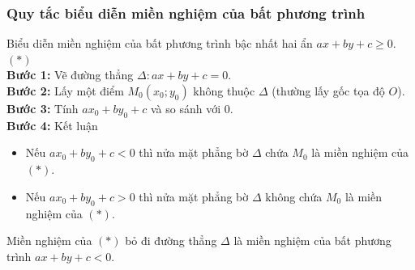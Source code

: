 \subsubsection{Quy tắc biểu diễn miền nghiệm của bất phương trình}
\begin{khung4}{}
	Biểu diễn miền nghiệm của bất phương trình bậc nhất hai ẩn $ax+by+c\geq 0$.\quad $(*)$\\
\textbf{Bước 1:} Vẽ đường thẳng $\Delta\colon ax+by+c=0$.\\
\textbf{Bước 2:} Lấy một điểm $M_0\left(x_0;y_0\right)$ không thuộc $\Delta$ (thường lấy gốc tọa độ $O$).\\
\textbf{Bước 3:} Tính $ax_0+by_0+c$ và so sánh với $0$.\\
\textbf{Bước 4:} Kết luận
	\begin{itemize}
		\item Nếu $ax_0+by_0+c<0$ thì nửa mặt phẳng bờ $\Delta$ chứa $M_0$ là miền nghiệm của $(*)$.
		\item Nếu $ax_0+by_0+c>0$ thì nửa mặt phẳng bờ $\Delta$ không chứa $M_0$ là miền nghiệm của $(*)$.
	\end{itemize}
\begin{note}
	Miền nghiệm của $(*)$ bỏ đi đường thẳng $\Delta$ là miền nghiệm của bất phương trình $ax+by+c<0$.
\end{note}
\end{khung4}

